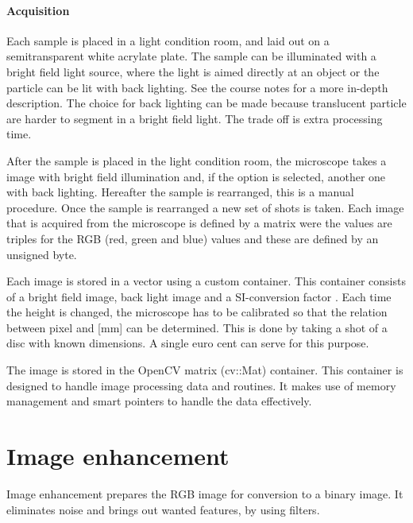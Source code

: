 \documentclass[11pt,fleqn,,a4paper,twoside,openright]{book}
\begin{document}
\paragraph{Acquisition} \label{Acquistion} Each sample is placed in a light condition room, and laid out on a semitransparent white acrylate plate. The sample can be illuminated with a bright field light source, where the light is aimed directly at an object or the particle can be lit with back lighting. See the course notes \cite{ypma_course_2014} for a more in-depth description. The choice for back lighting can be made because translucent particle are harder to segment in a bright field light. The trade off is extra processing time.

After the sample is placed in the light condition room, the microscope takes a image with bright field illumination  and, if the option is selected, another one with back lighting.  Hereafter the sample is rearranged, this is a manual procedure. Once the sample is rearranged a new set of shots is taken. Each image that is acquired from the microscope is defined by a matrix were the values are triples for the RGB  (red, green and blue) values and these are defined by an unsigned byte. 

Each image is stored in a vector using a custom container. This container consists of a bright field image, back light image and a SI-conversion factor . Each time the height is changed, the microscope has to be calibrated so that the relation between pixel and [mm] can be determined. This is done by taking a shot of a disc with known dimensions. A single euro cent can serve for this purpose.

\begin{remark}
	The image is stored in the OpenCV matrix (cv::Mat) container. This container is  designed to handle image processing data and routines. It makes use of memory management and smart pointers to handle the data effectively. 
\end{remark}

\section{Image enhancement}
Image enhancement prepares the RGB image for conversion to a binary image. It eliminates noise and brings out wanted features, by using filters.
\end{document}
